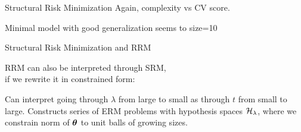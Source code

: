 \documentclass[11pt,compress,t,notes=noshow, xcolor=table]{beamer}
\begin{document}
\begin{frame} {Structural Risk Minimization}
Again, complexity vs CV score. 


Minimal model with good generalization seems to size=10 

\end{frame}


\begin{frame} {Structural Risk Minimization and RRM}

RRM can also be interpreted through SRM, \\
if we rewrite it in constrained form:


\vfill

Can interpret going through $\lambda$ from large to small as through $t$ from small to large.
Constructs series of ERM problems with hypothesis spaces $\mathcal{H}_\lambda$, 
where we constrain norm of $\bm{\theta}$ to unit balls of growing sizes.
\end{frame}


\endlecture
\end{document}
